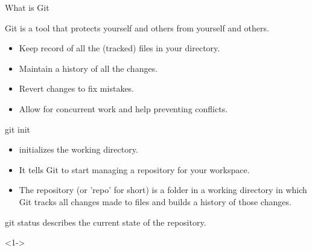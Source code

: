 \begin{frame}[fragile]{What is Git}
			
	Git is a tool that protects yourself and others from yourself and others.
		
	\begin{itemize}
		\item <2-> Keep record of all the (tracked) files in your directory.
		\item <3-> Maintain a history of all the changes.
		\item <4-> Revert changes to fix mistakes.
		\item <5-> Allow for concurrent work and help preventing conflicts.
	\end{itemize}
		
			
\end{frame}

\begin{frame}[fragile]{git init}
	\begin{itemize}[<+->]
		\item  {} initializes the working directory.
		      		      
		\item It tells Git to start managing a \alert{repository} for your workspace.
		      		       
		\item The repository (or 'repo' for short) is a folder in a working directory in which Git tracks all changes made to files and builds a history of those changes.
		      		       
	\end{itemize}
\end{frame}

\begin{frame}[fragile]{git status}
     describes the current state of the repository.

	\begin{shellblock}<1->{
}\end{shellblock}
		      		       
\end{frame}

